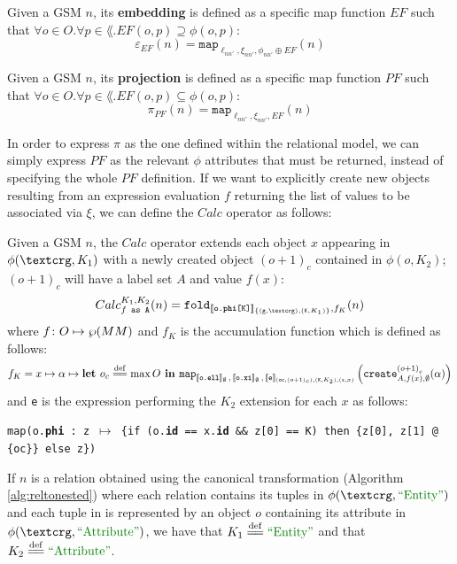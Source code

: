 \begin{definition}[Embedding]
	Given a GSM $n$, its \textbf{embedding} is defined as a specific map function $EF$ such that $\forall o\in O.\forall p\in\lang. EF(o,p)\supseteq \phi(o,p)$:
	\[\varepsilon_{EF}(n)=\texttt{map}_{\ell_{nn'},\xi_{nn'},\phi_{nn'}\oplus EF}(n)\]
\end{definition}

\begin{definition}[Projection]
	Given a GSM $n$, its \textbf{projection} is defined as a specific map function $PF$ such that $\forall o\in O.\forall p\in\lang. EF(o,p)\subseteq \phi(o,p)$:
	\[\pi_{PF}(n)=\texttt{map}_{\ell_{nn'},\xi_{nn'}, EF}(n)\]
\end{definition}

In order to express $\pi$ as the one defined within the relational model, we can simply express $PF$ as the relevant $\phi$ attributes that must be returned, instead of specifying the whole $PF$ definition. If we want to explicitly create new objects resulting from an expression evaluation $f$ returning the list of values to be associated via $\xi$, we can define the $Calc$ operator \cite{Calders2006} as follows:


\begin{definition}[Calc]\label{def:calc}
Given a GSM $n$, the $Calc$ operator extends each object $x$ appearing in $\phi(\ngraph,K_1)$ with a newly created object $(o+1)_c$ contained in $\phi(o,K_2)$; $(o+1)_c$ will have a  label set $A$ and value $f(x)$:
\[Calc_{f\texttt{ as A}}^{K_1,K_2}(n)=\texttt{fold}_{\jsem{\texttt{o.\textbf{phi}[K]}}_{\{(\texttt{g},\ngraph),(\texttt{K},K_1)\}},f_K}(n)\]
where $f\colon O\mapsto\partof{\metamodel}$ and $f_K$ is the accumulation function which is defined as follows:
\[f_K=x\mapsto \alpha\mapsto \textbf{let }o_c\overset{\mathrm{def}}{=\mathrel{\mkern-3mu}=}\max O\textbf{ in }\texttt{map}_{[\! [\texttt{o.\textbf{ell}}]\!]_{\emptyset}\,,\,[\! [\texttt{o.\textbf{xi}}]\!]_{\emptyset}\,,\,[\! [\texttt{e}]\!]_{(\texttt{oc},(o+1)_c),(\texttt{K},K_2),(\texttt{x},x)}}\left(\texttt{create}^{{(o+1)}_c}_{A,f(x),\emptyset}(\alpha)\right)\]
and \texttt{e} is the expression performing the $K_2$ extension for each $x$ as follows:
\begin{center}
\texttt{map(o.\textbf{phi} : z $\mapsto$ \{if (o.\textbf{id} == x.\textbf{id} \&\& z[0] == K) then \{z[0], z[1] @ \{oc\}\} else z\})}
\end{center}

\end{definition}
If $n$ is a relation obtained using the canonical transformation (Algorithm \vref{alg:reltonested}) where each relation contains its tuples in $\phi(\ngraph,\ONTA)$ and each tuple in is represented by an object $o$ containing its attribute in  $\phi(\ngraph,\mstr{Attribute})$, we have that $K_1\eqdef\ONTA$ and that $K_2\eqdef \mstr{Attribute}$.

